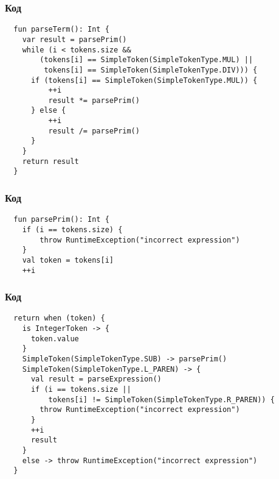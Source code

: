 \documentclass[pdf,russian]{beamer}
\begin{document}
\begin{frame}[fragile]
    \frametitle{Код}
    \begin{verbatim}
  fun parseTerm(): Int {
    var result = parsePrim()
    while (i < tokens.size &&
        (tokens[i] == SimpleToken(SimpleTokenType.MUL) ||
         tokens[i] == SimpleToken(SimpleTokenType.DIV))) {
      if (tokens[i] == SimpleToken(SimpleTokenType.MUL)) {
          ++i
          result *= parsePrim()
      } else {
          ++i
          result /= parsePrim()
      }
    }
    return result
  }
    \end{verbatim}
\end{frame}

\begin{frame}[fragile]
    \frametitle{Код}
    \begin{verbatim}
  fun parsePrim(): Int {
    if (i == tokens.size) {
        throw RuntimeException("incorrect expression")
    }
    val token = tokens[i]
    ++i
    \end{verbatim}
\end{frame}

\begin{frame}[fragile]
    \frametitle{Код}
    \begin{verbatim}
  return when (token) {
    is IntegerToken -> {
      token.value
    }
    SimpleToken(SimpleTokenType.SUB) -> parsePrim()
    SimpleToken(SimpleTokenType.L_PAREN) -> {
      val result = parseExpression()
      if (i == tokens.size ||
          tokens[i] != SimpleToken(SimpleTokenType.R_PAREN)) {
        throw RuntimeException("incorrect expression")
      }
      ++i
      result
    }
    else -> throw RuntimeException("incorrect expression")
  }
    \end{verbatim}
\end{frame}
\end{document}
